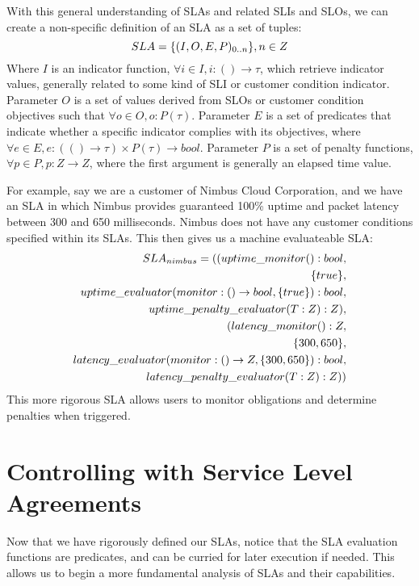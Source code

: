 With this general understanding of SLAs and related SLIs and SLOs, we can create a non-specific definition of an SLA as a set of tuples:
\begin{equation}
SLA = \lbrace (I,O,E,P)_{0..n} \rbrace, n \in Z \\
\end{equation}
Where $ I $ is an indicator function, $ \forall i \in I, i : () \rightarrow \tau $, which retrieve indicator values, generally related to some kind of SLI or customer condition indicator.  Parameter $ O $ is a set of values derived from SLOs or customer condition objectives such that $ \forall o \in O, o : P(\tau) $.  Parameter $ E $ is a set of predicates that indicate whether a specific indicator complies with its objectives, where $ \forall e \in E, e : ( () \rightarrow \tau ) \times P(\tau) \rightarrow bool $.  Parameter $ P $ is a set of penalty functions, $ \forall p \in P, p : Z \rightarrow Z $, where the first argument is generally an elapsed time value.

For example, say we are a customer of Nimbus Cloud Corporation, and we have an SLA in which Nimbus provides guaranteed 100\% uptime and packet latency between 300 and 650 milliseconds.  Nimbus does not have any customer conditions specified within its SLAs.  This then gives us a machine evaluateable SLA:
\begin{align}
SLA_{nimbus} = ( ( uptime\_monitor() : bool, \\
\lbrace true \rbrace, \notag \\
uptime\_evaluator( monitor : () \rightarrow bool, \lbrace true \rbrace) : bool, \notag \\
uptime\_penalty\_evaluator( T : Z ) : Z ), \notag \\
( latency\_monitor() : Z, \notag \\
\lbrace 300, 650 \rbrace, \notag \\
latency\_evaluator( monitor : () \rightarrow Z, \lbrace 300, 650 \rbrace) : bool, \notag \\
latency\_penalty\_evaluator( T : Z ) : Z) ) \notag
\end{align}
This more rigorous SLA allows users to monitor obligations and determine penalties when triggered.

\section{Controlling with Service Level Agreements}\label{sec:SLA-analysis}
Now that we have rigorously defined our SLAs, notice that the SLA evaluation functions are predicates, and can be curried for later execution if needed.  This allows us to begin a more fundamental analysis of SLAs and their capabilities.

